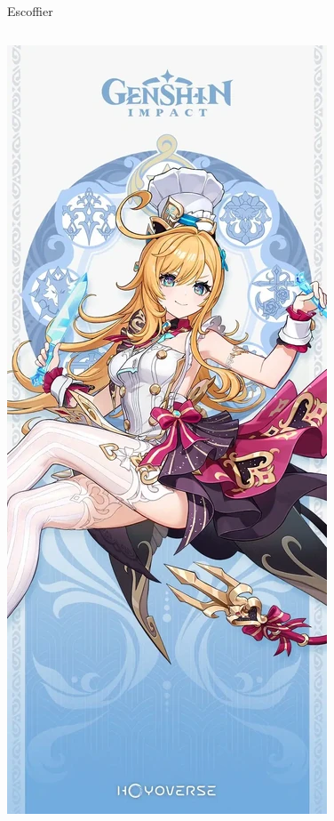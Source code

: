 \documentclass{beamer}
\begin{document}
\begin{frame}{Escoffier}
\begin{columns}
\includegraphics[width=\textwidth]{Escoffier.png}
\end{columns}
\end{frame}
\end{document}
